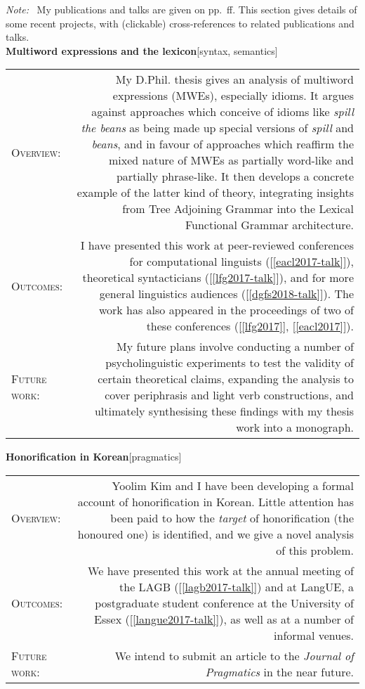 \documentclass[11pt,a4paper,twoside]{article}
\makeatletter
\newlength{\rulelength}%
\newcommand{\REx}[2]{%
\vspace*{0.5\baselineskip}%
{\large\textbf{#1}\hfill\textnormal{[#2]}}%
\vspace*{0.7\baselineskip}%
}
\newenvironment{cvsection}{%
  \setlength{\extrarowheight}{0.70ex}
  \begin{longtable}[l]{@{} L R @{}}
}{%
  \end{longtable}
}
\newcommand{\sref}[1]{[\ref{#1}]}
\newcommand{\note}{\emph{Note: }}
\newcommand{\subhead}[1]{%
\textsc{#1}:%
}
\makeatother
\begin{document}
\note\ My publications and talks are given on pp.~\pageref{scholarship}ff. This section gives details of some recent projects, with (clickable) cross-references to related publications and talks.\\

\REx{Multiword expressions and the lexicon}{syntax, semantics}
\begin{cvsection}
  \subhead{Overview} &%
  My D.Phil. thesis gives an analysis of multiword expressions (MWEs), especially idioms. It argues against approaches which conceive of idioms like \emph{spill the beans} as being made up special versions of \emph{spill} and \emph{beans}, and in favour of approaches which reaffirm the mixed nature of MWEs as partially word-like and partially phrase-like. It then develops a concrete example of the latter kind of theory, integrating insights from Tree Adjoining Grammar into the Lexical Functional Grammar architecture.%
\\
  \subhead{Outcomes} &%
  I have presented this work at peer-reviewed conferences for computational linguists (\sref{eacl2017-talk}), theoretical syntacticians (\sref{lfg2017-talk}), and for more general linguistics audiences (\sref{dgfs2018-talk}). The work has also appeared in the proceedings of two of these conferences (\sref{lfg2017}, \sref{eacl2017}).%
\\
  \subhead{Future work} &%
  My future plans involve conducting a number of psycholinguistic experiments to test the validity of certain theoretical claims, expanding the analysis to cover periphrasis and light verb constructions, and ultimately synthesising these findings with my thesis work into a monograph.
\end{cvsection}

\REx{Honorification in Korean}{pragmatics}
\begin{cvsection}
  \subhead{Overview} &%
  Yoolim Kim and I have been developing a formal account of honorification in Korean. Little attention has been paid to how the \emph{target} of honorification (the honoured one) is identified, and we give a novel analysis of this problem.%
\\
  \subhead{Outcomes} &%
  We have presented this work at the annual meeting of the LAGB (\sref{lagb2017-talk}) and at LangUE, a postgraduate student conference at the University of Essex (\sref{langue2017-talk}), as well as at a number of informal venues.%
\\
  \subhead{Future work} &%
  We intend to submit an article to the \textit{Journal of Pragmatics} in the near future.
\end{cvsection}
\end{document}
